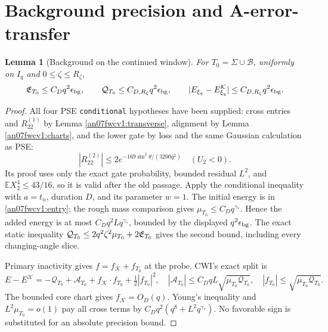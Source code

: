 \documentclass[11pt]{article}
\numberwithin{equation}{section}
\newtheorem{lemma}[theorem]{Lemma}
\newcommand{\E}{\mathbb E}\newcommand{\dd}{\,d}
\newcommand{\KK}{\mathcal K}\newcommand{\BB}{\mathcal B}
\begin{document}
\section{Background precision and A-error-transfer}
\label{an07fwcv1:errorsection}
\begin{lemma}[Background on the continued window]
\label{an07fwcv1:background}
For \(T_0=\Sigma\cup\BB\), uniformly on \(I_q\) and
\(0\le\zeta\le R_\zeta\),
\begin{equation}
 \EE_{T_0}\le C_Dq^2\epsilon_{\rm bg},\qquad
 \mathcal Q_{T_0}\le C_{D,R_\zeta}q^2\epsilon_{\rm bg},\qquad
 |E_{\xi_q}-E_{\xi_q}^{\KK}|\le
                   C_{D,R_\zeta}q^2\epsilon_{\rm bg}.
 \label{an07fwcv1:backgroundbound}
\end{equation}
\end{lemma}
\begin{proof}
All four PSE \texttt{conditional} hypotheses have been supplied:
cross entries and \(R_{22}^{(1)}\) by
Lemma \ref{an07fwcv1:transverse}, alignment by
Lemma \ref{an07fwcv1:charts}, and the lower gate by loss and
the same Gaussian calculation as PSE:
\[
 |R_{22}^{(2)}|\le2e^{-169\sin^2\theta/(3200q^2)}
                                      \quad(U_2<0).
\]
Its proof uses only the exact gate probability, bounded residual
\(L^2\), and \(\E X_2^4\le43/16\), so it is valid after
the old passage. Apply the conditional inequality with
\(a=t_n\), duration \(D\), and its parameter \(w=1\).
The initial energy is in \eqref{an07fwcv1:entry}; the rough
mass comparison gives \(\mu_{T_0}\le C_Dq^{\gamma_*}\).
Hence the added energy is at most \(C_Dq^2Lq^{\gamma_*}\),
bounded by the displayed \(q^2\epsilon_{\rm bg}\).
The exact static inequality
\(\mathcal Q_{T_0}\le2q^2\zeta^2\mu_{T_0}+2\mathfrak E_{T_0}\)
gives the second bound, including every changing-angle slice.

Primary inactivity gives \(f=f_\KK+f_{T_0}\) at the probe.
CWI's exact split is
\[
 E-E^\KK=-\mathcal Q_{T_0}+\mathcal A_{T_0}
       +f_\KK\cdot f_{T_0}+\tfrac12|f_{T_0}|^2,
 \quad |\mathcal A_{T_0}|\le C_DqL\sqrt{\mu_{T_0}\mathcal Q_{T_0}},
 \quad |f_{T_0}|\le\sqrt{\mu_{T_0}\mathcal Q_{T_0}}.
\]
The bounded core chart gives \(f_\KK=O_D(q)\).
Young's inequality and \(L^2\mu_{T_0}=o(1)\) pay all
cross terms by \(C_Dq^2(q^8+L^2q^{\gamma_*})\).
No favorable sign is substituted for an absolute precision bound.
\end{proof}
\end{document}
